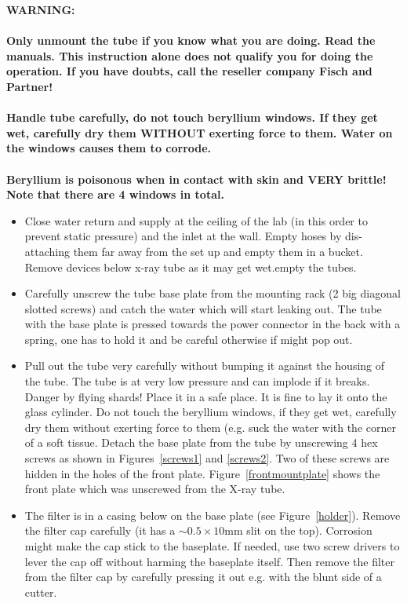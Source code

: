 \documentclass[a4paper,12pt,twoside]{article}
\begin{document}
\begin{appendices}
\textbf{
WARNING:  \\
\\
Only unmount the tube if you know what you are doing. Read the manuals. This instruction alone does not qualify you for doing the operation. If you have doubts, call the reseller company Fisch and Partner! 
\\
\\
Handle tube carefully, do not touch beryllium windows. If they get wet, carefully dry them WITHOUT exerting force to them. Water on the windows causes them to corrode.
\\
\\
Beryllium is poisonous when in contact with skin and VERY brittle! Note that there are 4 windows in total.}

\begin{itemize}

\item Close water return and supply at the ceiling of the lab (in this order to prevent static pressure) and the inlet at the wall. Empty hoses by dis-attaching them far away from the set up and empty them in a bucket. Remove devices below x-ray tube as it may get wet.empty the tubes. 

\item Carefully unscrew the tube base plate from the mounting rack (2 big diagonal slotted screws) and catch the water which will start leaking out. The tube with the base plate is pressed towards the power connector in the back with a spring, one has to hold it and be careful otherwise if might pop out.

\item Pull out the tube very carefully without bumping it against the housing of the tube. The tube is at very low pressure and can implode if it breaks. Danger by flying shards! Place it in a safe place. It is fine to lay it onto the glass cylinder. Do not touch the beryllium windows, if they get wet, carefully dry them without exerting force to them (e.g. suck the water with the corner of a soft tissue. Detach the base plate from the tube by unscrewing 4 hex screws as shown in Figures~\ref{screws1} and \ref{screws2}. Two of these screws are hidden in the holes of the front plate. Figure~\ref{frontmountplate} shows the front plate which was unscrewed from the X-ray tube.

\item The filter is in a casing below on the base plate (see Figure~\ref{holder}). Remove the filter cap carefully (it has a $\sim 0.5 \times 10$\;\si{\milli\meter} slit on the top). Corrosion might make the cap stick to the baseplate. If needed, use two screw drivers to lever the cap off without harming the baseplate itself. Then remove the filter from the filter cap by carefully pressing it out e.g. with the blunt side of a cutter.


\end{itemize}
\end{appendices}
\end{document}
